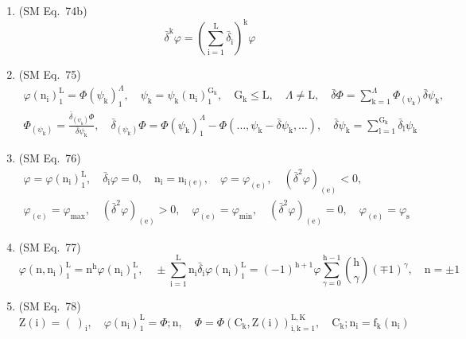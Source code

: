 \documentclass[12pt]{article}
\begin{document}
\begin{enumerate}[label=(\arabic*), series=formellist]
    \item (SM Eq.\ 74b) 
    \[
    \bar{\delta}^\mathrm{k} \varphi = \left( \sum_{\mathrm{i}=1}^\mathrm{L} \bar{\delta}_\mathrm{i} \right)^\mathrm{k} \varphi
    \]

    \item (SM Eq.\ 75) 
    \[
    \begin{gathered}
    \varphi(\mathrm{n_i})_1^\mathrm{L} = \Phi(\psi_\mathrm{k})_1^\Lambda, \quad \psi_\mathrm{k} = \psi_\mathrm{k}(\mathrm{n_i})_1^{\mathrm{G_k}}, \quad \mathrm{G_k} \le \mathrm{L}, \quad \Lambda \ne \mathrm{L}, \quad \bar{\delta}\Phi = \sum_{\mathrm{k}=1}^\Lambda \Phi_{(\psi_\mathrm{k})} \bar{\delta}\psi_\mathrm{k}, \\
    \Phi_{(\psi_\mathrm{k})} = \frac{\bar{\delta}_{(\psi_\mathrm{k})}\Phi}{\bar{\delta}\psi_\mathrm{k}}, \quad \bar{\delta}_{(\psi_\mathrm{k})}\Phi = \Phi(\psi_\mathrm{k})_1^\Lambda - \Phi(\dots, \psi_\mathrm{k} - \bar{\delta}\psi_\mathrm{k}, \dots), \quad \bar{\delta}\psi_\mathrm{k} = \sum_{\mathrm{l}=1}^{\mathrm{G_k}} \bar{\delta}_\mathrm{l} \psi_\mathrm{k}
    \end{gathered}
    \]

    \item (SM Eq.\ 76) 
    \[
    \begin{gathered}
    \varphi = \varphi(\mathrm{n_i})_1^\mathrm{L}, \quad \bar{\delta}_\mathrm{i} \varphi = 0, \quad \mathrm{n_i} = \mathrm{n}_{\mathrm{i(e)}}, \quad \varphi = \varphi_{\mathrm{(e)}}, \quad (\bar{\delta}^2\varphi)_{\mathrm{(e)}} < 0, \\
    \varphi_{\mathrm{(e)}} = \varphi_{\max}, \quad (\bar{\delta}^2\varphi)_{\mathrm{(e)}} > 0, \quad \varphi_{\mathrm{(e)}} = \varphi_{\min}, \quad (\bar{\delta}^2\varphi)_{\mathrm{(e)}} = 0, \quad \varphi_{\mathrm{(e)}} = \varphi_\mathrm{s}
    \end{gathered}
    \]

    \item (SM Eq.\ 77) 
    \[
    \varphi(\mathrm{n}, \mathrm{n_i})_1^\mathrm{L} = \mathrm{n^h} \varphi(\mathrm{n_i})_1^\mathrm{L}, \quad \pm\sum_{\mathrm{i}=1}^\mathrm{L} \mathrm{n_i} \bar{\delta}_\mathrm{i} \varphi(\mathrm{n_i})_1^\mathrm{L} = (-1)^{\mathrm{h}+1} \varphi \sum_{\gamma=0}^{\mathrm{h}-1} \binom{\mathrm{h}}{\gamma} (\mp 1)^\gamma, \quad \mathrm{n} = \pm 1
    \]

    \item (SM Eq.\ 78) 
    \[
    \mathrm{Z}(\mathrm{i}) = (\ )_\mathrm{i}, \quad \varphi(\mathrm{n_i})_1^\mathrm{L} = \Phi;\mathrm{n}, \quad \Phi = \Phi(\mathrm{C_k}, \mathrm{Z}(\mathrm{i}))_{\mathrm{i,k}=1}^{\mathrm{L,K}}, \quad \mathrm{C_k};\mathrm{n_i} = \mathrm{f_k}(\mathrm{n_i})
    \]


\end{enumerate}
\end{document}
